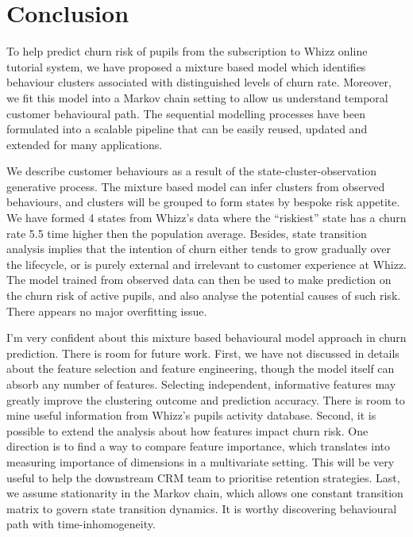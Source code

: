 \section{Conclusion}
\label{sec:conclusion}

To help predict churn risk of pupils from the subscription to Whizz online tutorial system, we have proposed a mixture based model which identifies behaviour clusters associated with distinguished levels of churn rate. Moreover, we fit this model into a Markov chain setting  to allow us understand temporal customer behavioural path. The sequential modelling processes have been formulated into a scalable pipeline that can be easily reused, updated and extended for many applications.

We describe customer behaviours as a result of the state-cluster-observation generative process. The mixture based model can infer clusters from observed behaviours, and clusters will be grouped to form states by bespoke risk appetite. We have formed 4 states from Whizz's data where the ``riskiest'' state has a churn rate 5.5 time higher then the population average. Besides, state transition analysis implies that the intention of churn either tends to grow gradually over the lifecycle, or is purely external and irrelevant to customer experience at Whizz. The model trained from observed data can then be used to make prediction on the churn risk of active pupils, and also analyse the potential causes of such risk. There appears no major overfitting issue.

I'm very confident about this mixture based behavioural model approach in churn prediction. There is room for future work. First, we have not discussed in details about the feature selection and feature engineering, though the model itself can absorb any number of features. Selecting independent, informative features may greatly improve the clustering outcome and prediction accuracy. There is room to mine useful information from Whizz's pupils activity database. Second, it is possible to extend the analysis about how features impact churn risk. One direction is to find a way to compare feature importance, which translates into measuring importance of dimensions in a multivariate setting. This will be very useful to help the downstream CRM team to prioritise retention strategies. Last, we assume stationarity in the Markov chain, which allows one constant transition matrix to govern state transition dynamics. It is worthy discovering behavioural path with time-inhomogeneity.